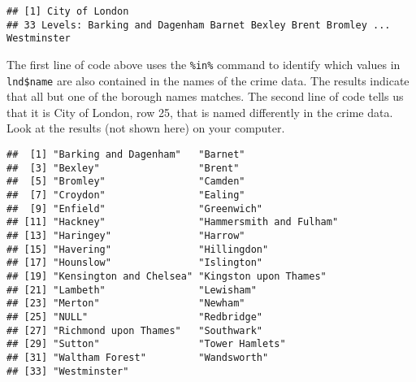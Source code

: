 \documentclass[]{article}
\newenvironment{Shaded}{}{}
\newcommand{\KeywordTok}[1]{\textcolor[rgb]{0.00,0.44,0.13}{\textbf{{#1}}}}
\newcommand{\DecValTok}[1]{\textcolor[rgb]{0.25,0.63,0.44}{{#1}}}
\newcommand{\StringTok}[1]{\textcolor[rgb]{0.25,0.44,0.63}{{#1}}}
\newcommand{\CommentTok}[1]{\textcolor[rgb]{0.38,0.63,0.69}{\textit{{#1}}}}
\newcommand{\NormalTok}[1]{{#1}}
\begin{document}
\begin{verbatim}
## [1] City of London
## 33 Levels: Barking and Dagenham Barnet Bexley Brent Bromley ... Westminster
\end{verbatim}

The first line of code above uses the \texttt{\%in\%} command to
identify which values in \texttt{lnd\$name} are also contained in the
names of the crime data. The results indicate that all but one of the
borough names matches. The second line of code tells us that it is City
of London, row 25, that is named differently in the crime data. Look at
the results (not shown here) on your computer.

\begin{Shaded}
\end{Shaded}

\begin{verbatim}
##  [1] "Barking and Dagenham"   "Barnet"                
##  [3] "Bexley"                 "Brent"                 
##  [5] "Bromley"                "Camden"                
##  [7] "Croydon"                "Ealing"                
##  [9] "Enfield"                "Greenwich"             
## [11] "Hackney"                "Hammersmith and Fulham"
## [13] "Haringey"               "Harrow"                
## [15] "Havering"               "Hillingdon"            
## [17] "Hounslow"               "Islington"             
## [19] "Kensington and Chelsea" "Kingston upon Thames"  
## [21] "Lambeth"                "Lewisham"              
## [23] "Merton"                 "Newham"                
## [25] "NULL"                   "Redbridge"             
## [27] "Richmond upon Thames"   "Southwark"             
## [29] "Sutton"                 "Tower Hamlets"         
## [31] "Waltham Forest"         "Wandsworth"            
## [33] "Westminster"
\end{verbatim}

\begin{Shaded}
\end{Shaded}
\end{document}
